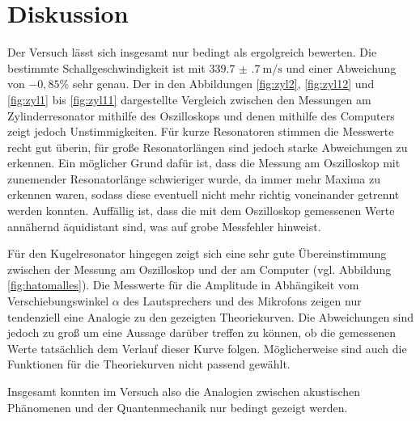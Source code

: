 \section{Diskussion}
\label{sec:Diskussion}

Der Versuch lässt sich insgesamt nur bedingt als ergolgreich bewerten. Die bestimmte
Schallgeschwindigkeit ist mit $\SI{339.7(7)}{\meter\per\second}$ und einer Abweichung
von $-0{,}85\%$ sehr genau.
Der in den Abbildungen \ref{fig:zyl2}, \ref{fig:zyl12} und \ref{fig:zyl1} bis \ref{fig:zyl11}
dargestellte Vergleich zwischen den Messungen am Zylinderresonator mithilfe des Oszilloskops und denen mithilfe des
Computers zeigt jedoch Unstimmigkeiten. Für kurze Resonatoren stimmen die Messwerte recht
gut überin, für große Resonatorlängen sind jedoch starke Abweichungen zu erkennen. Ein möglicher
Grund dafür ist, dass die Messung am Oszilloskop mit zunemender Resonatorlänge schwieriger wurde,
da immer mehr Maxima zu erkennen waren, sodass diese eventuell nicht mehr richtig voneinander getrennt
werden konnten. Auffällig ist, dass die mit dem Oszilloskop gemessenen Werte annähernd
äquidistant sind, was auf grobe Messfehler hinweist.

Für den Kugelresonator hingegen zeigt sich eine sehr gute Übereinstimmung zwischen der Messung
am Oszilloskop und der am Computer (vgl. Abbildung \ref{fig:hatomalles}). Die Messwerte für die
Amplitude in Abhängikeit vom Verschiebungswinkel $\alpha$ des Lautsprechers und des Mikrofons
zeigen nur tendenziell eine Analogie zu den gezeigten Theoriekurven. Die Abweichungen sind
jedoch zu groß um eine Aussage darüber treffen zu können, ob die gemessenen Werte
tatsächlich dem Verlauf dieser Kurve folgen. Möglicherweise sind auch die Funktionen
für die Theoriekurven nicht passend gewählt.

Insgesamt konnten im Versuch also die Analogien zwischen akustischen Phänomenen
und der Quantenmechanik nur bedingt gezeigt werden.
